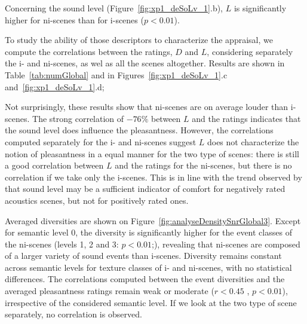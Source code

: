 \documentclass[twoside,twocolumn]{article}
\begin{document}
Concerning the sound level (Figure~\ref{fig:xp1_deSoLv_1}.b), $L$ is significantly higher for ni-scenes than for i-scenes ($p<0.01$). 

To study the ability of those descriptors to characterize the appraisal, we compute the correlations between the ratings, $D$ and $L$, considering separately the i- and ni-scenes, as wel as all the scenes altogether. Results are shown in Table~\ref{tab:numGlobal} and in Figures~\ref{fig:xp1_deSoLv_1}.c and~\ref{fig:xp1_deSoLv_1}.d; 

Not surprisingly, these results show that ni-scenes are on average louder than i-scenes. The strong correlation of $-76\%$ between $L$ and the ratings indicates that the sound level does influence the pleasantness. However, the correlations computed separately for the i- and ni-scenes suggest $L$ does not characterize the notion of pleasantness in a equal manner for the two type of scenes:  there is still a good correlation between $L$ and the ratings for the ni-scenes, but there is no correlation if we take only the i-scenes. This is in line with the trend observed by \cite{lavandier2006contribution} that sound level may be a sufficient indicator of comfort for negatively rated acoustics scenes, but not for positively rated ones.


Averaged diversities are shown on Figure~\ref{fig:analyseDensitySnrGlobal3}. Except for semantic level 0, the diversity is significantly higher for the event classes of the ni-scenes (levels 1, 2 and 3: $p<0.01$;), revealing that ni-scenes are composed of a larger variety of sound events than i-scenes. Diversity remains constant across semantic levels for texture classes of i- and ni-scenes, with no statistical differences. The correlations computed between the event diversities and the averaged pleasantness ratings remain weak or moderate ($r<0.45$ , $p<0.01$), irrespective of the considered semantic level.  If we look at the two type of scene separately, no correlation is observed. 
\end{document}
